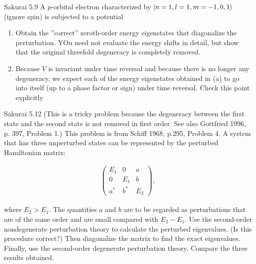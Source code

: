 \documentclass{article}
\begin{document}
	\newpage
	\begin{section}{Sakurai 5.9}
		A $p$-orbital electron characterized by $\ket{n = 1, l = 1, m = -1, 0, 1}$ (ignore spin) is subjected to a potential
		\begin{enumerate}
			\item Obtain the ''correct'' zeroth-order energy eigenstates that diagonalize the perturbation. YOu need not evaluate the energy shifts in detail, but show that the original threefold degeneracy is completely removed.
			\item Because $V$ is invariant under time reversal and because there is no longer any degeneracy, we expect each of the energy eigenstates obtained in (a) to go into itself (up to a phase factor or sign) under time reversal. Check this point explicitly
		\end{enumerate}

		\begin{tcolorbox}[breakable]
		\end{tcolorbox}
	\end{section}

	\newpage
	\begin{section}{Sakurai 5.12}
		(This is a tricky problem because the degeneracy between the first state and the second state is not removed in first order. See also Gottfried 1996, p. 397, Problem 1.) This problem is from Schiff 1968, p.295, Problem 4. A system that has three unperturbed states can be represented by the perturbed Hamiltonian matrix:

		\begin{align*}
			\begin{pmatrix}
				E_1 & 0 & a \\
				0 & E_1 & b \\
				a^* & b^* & E_2
			\end{pmatrix},
		\end{align*}

		where $E_2 > E_1$. The quantities $a$ and $b$ are to be regarded as perturbations that are of the same order and are small compared with $E_2 - E_1$. Use the second-order nondegenerate perturbation theory to calculate the perturbed eigenvalues. (Is this procedure correct?) Then diagonalize the matrix to find the exact eigenvalues. Finally, use the second-order degenerate perturbation theory. Compare the three results obtained.
		\begin{tcolorbox}[breakable]
		\end{tcolorbox}
	\end{section}
\end{document}
